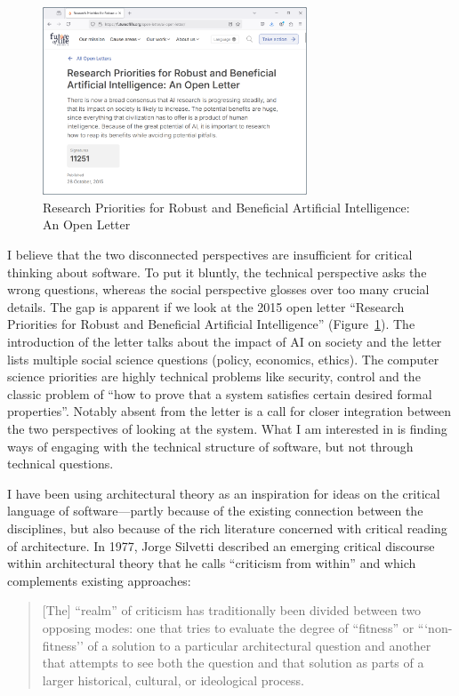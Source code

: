 \begin{figure}
\centering
\vspace{-1em}
\includegraphics[width=0.7\textwidth]{fig/ai.png}
\caption{Research Priorities for Robust and Beneficial Artificial Intelligence: An Open Letter}
\label{fig:ai}
\end{figure}

I believe that the two disconnected perspectives are insufficient for critical thinking about
software. To put it bluntly, the technical perspective asks the wrong questions, whereas the social
perspective glosses over too many crucial details. The gap is apparent if we look at the
2015 open letter ``Research Priorities for Robust and Beneficial Artificial
Intelligence'' (Figure~\ref{fig:ai}). The introduction of the letter talks
about the impact of AI on society and the letter lists multiple social science questions (policy,
economics, ethics). The computer science priorities are highly technical problems like security,
control and the classic problem of ``how to prove that a system satisfies certain desired formal
properties''. Notably absent from the letter is a call for closer integration between the
two perspectives of looking at the system. What I am interested in is finding ways
of engaging with the technical structure of software, but not through technical questions.

I have been using architectural theory as an inspiration for ideas on the critical language
of software---partly because of the existing connection between the disciplines, but also
because of the rich literature concerned with critical reading of architecture.
In 1977, Jorge Silvetti described an emerging critical discourse within architectural theory that
he calls ``criticism from within'' and which complements existing
approaches:

\begin{quote}
[The] ``realm'' of criticism has traditionally been divided between two opposing modes: one
that tries to evaluate the degree of ``fitness'' or ```non-fitness'' of a solution
to a particular architectural question and another that attempts to see both the question and
that solution as parts of a larger historical, cultural, or ideological process.
\end{quote}

